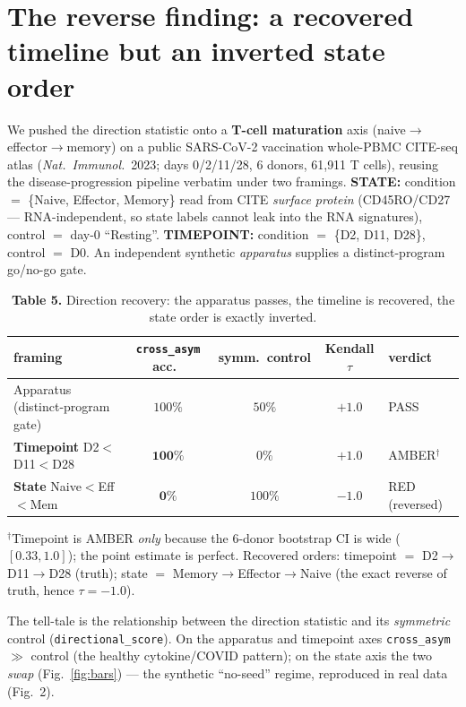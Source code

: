 \documentclass[11pt]{article}
\begin{document}
\section{The reverse finding: a recovered timeline but an inverted state order}
We pushed the direction statistic onto a \textbf{T-cell maturation} axis
(naive$\rightarrow$effector$\rightarrow$memory) on a public SARS-CoV-2 vaccination whole-PBMC
CITE-seq atlas (\emph{Nat.\ Immunol.}\ 2023; days 0/2/11/28, 6 donors, 61{,}911 T cells), reusing
the disease-progression pipeline verbatim under two framings. \textbf{STATE:} condition $=$
\{Naive, Effector, Memory\} read from CITE \emph{surface protein} (CD45RO/CD27 --- RNA-independent,
so state labels cannot leak into the RNA signatures), control $=$ day-0 ``Resting''.
\textbf{TIMEPOINT:} condition $=$ \{D2, D11, D28\}, control $=$ D0. An independent synthetic
\emph{apparatus} supplies a distinct-program go/no-go gate.

\begin{table}[h]\centering\small
\caption*{\textbf{Table 5.} Direction recovery: the apparatus passes, the timeline is recovered,
the state order is exactly inverted.}
\begin{tabular}{lcccl}
\toprule
framing & \texttt{cross\_asym} acc.\ & symm.\ control & Kendall $\tau$ & verdict \\
\midrule
Apparatus (distinct-program gate) & $100\%$ & $50\%$ & $+1.0$ & \textcolor{good}{PASS} \\
\textbf{Timepoint} D2$<$D11$<$D28 & $\mathbf{100\%}$ & $0\%$ & $\mathbf{+1.0}$ & \textcolor{mid}{AMBER}$^\dagger$ \\
\textbf{State} Naive$<$Eff$<$Mem & $\mathbf{0\%}$ & $100\%$ & $\mathbf{-1.0}$ & \textcolor{bad}{RED (reversed)} \\
\bottomrule
\end{tabular}
\end{table}
\vspace{-0.7em}
{\footnotesize $^\dagger$Timepoint is AMBER \emph{only} because the 6-donor bootstrap CI is wide
($[0.33,1.0]$); the point estimate is perfect. Recovered orders: timepoint $=$
D2$\rightarrow$D11$\rightarrow$D28 (truth); state $=$ Memory$\rightarrow$Effector$\rightarrow$Naive
(the exact reverse of truth, hence $\tau=-1.0$).}

The tell-tale is the relationship between the direction statistic and its \emph{symmetric} control
(\texttt{directional\_score}). On the apparatus and timepoint axes \texttt{cross\_asym} $\gg$
control (the healthy cytokine/COVID pattern); on the state axis the two \emph{swap}
(Fig.~\ref{fig:bars}) --- the synthetic ``no-seed'' regime, reproduced in real data (Fig.~2).
\end{document}
